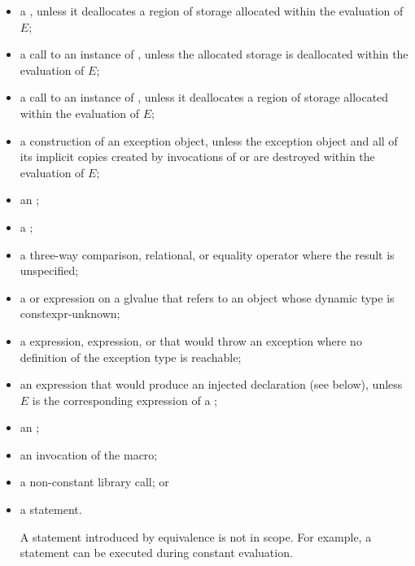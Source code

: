 \begin{itemize}
\item
a ,
unless it deallocates a region of storage
allocated within the evaluation of $E$;

\item
a call to an instance of
,
unless the allocated storage is deallocated within the evaluation of $E$;

\item
a call to an instance of
,
unless it deallocates a region of storage
allocated within the evaluation of $E$;

\item
a construction of an exception object,
unless the exception object and
all of its implicit copies created by invocations of
 or 
are destroyed within the evaluation of $E$;

\item
an ;

\item
a ;

\item
a three-way comparison,
relational, or equality
operator where the result is unspecified;

\item
a  or
 expression
on a glvalue that refers to an object
whose dynamic type is constexpr-unknown;

\item
a  expression,
 expression, or
that would throw an exception
where no definition of the exception type is reachable;

\item
an expression that would produce an injected declaration (see below),
unless $E$ is the corresponding expression of
a ;

\item
an ;

\item
an invocation of the  macro;

\item
a non-constant library call;
or

\item
a  statement.
\begin{note}
A  statement introduced by equivalence
is not in scope.
For example, a  statement
can be executed during constant evaluation.
\end{note}
\end{itemize}

